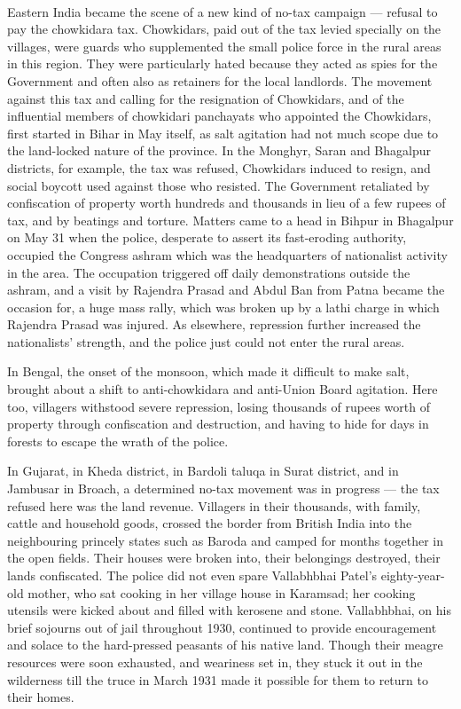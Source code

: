 \paragraph*{}
Eastern India became the scene of a new kind of no-tax campaign --- refusal to pay the chowkidara tax. Chowkidars, paid out of the tax levied specially on the villages, were guards who supplemented the small police force in the rural areas in this region. They were particularly hated because they acted as spies for the Government and often also as retainers for the local landlords. The movement against this tax and calling for the resignation of Chowkidars, and of the influential members of chowkidari panchayats who appointed the Chowkidars, first started in Bihar in May itself, as salt agitation had not much scope due to the land-locked nature of the province. In the Monghyr, Saran and Bhagalpur districts, for example, the tax was refused, Chowkidars induced to resign, and social boycott used against those who resisted. The Government retaliated by confiscation of property worth hundreds and thousands in lieu of a few rupees of tax, and by beatings and torture. Matters came to a head in Bihpur in Bhagalpur on May 31 when the police, desperate to assert its fast-eroding authority, occupied the Congress ashram which was the headquarters of nationalist activity in the area. The occupation triggered off daily demonstrations outside the ashram, and a visit by Rajendra Prasad and Abdul Ban from Patna became the occasion for, a huge mass rally, which was broken up by a lathi charge in which Rajendra Prasad was injured. As elsewhere, repression further increased the nationalists' strength, and the police just could not enter the rural areas.

In Bengal, the onset of the monsoon, which made it difficult to make salt, brought about a shift to anti-chowkidara and anti-Union Board agitation. Here too, villagers withstood severe repression, losing thousands of rupees worth of property through confiscation and destruction, and having to hide for days in forests to escape the wrath of the police.

In Gujarat, in Kheda district, in Bardoli taluqa in Surat district, and in Jambusar in Broach, a determined no-tax movement was in progress --- the tax refused here was the land revenue. Villagers in their thousands, with family, cattle and household goods, crossed the border from British India into the neighbouring princely states such as Baroda and camped for months together in the open fields. Their houses were broken into, their belongings destroyed, their lands confiscated. The police did not even spare Vallabhbhai Patel's eighty-year-old mother, who sat cooking in her village house in Karamsad; her cooking utensils were kicked about and filled with kerosene and stone. Vallabhbhai, on his brief sojourns out of jail throughout 1930, continued to provide encouragement and solace to the hard-pressed peasants of his native land. Though their meagre resources were soon exhausted, and weariness set in, they stuck it out in the wilderness till the truce in March 1931 made it possible for them to return to their homes.

